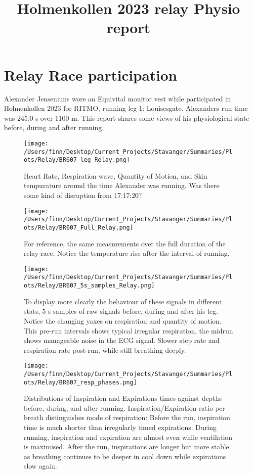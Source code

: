 \title{Holmenkollen 2023 relay Physio report}
 \maketitle
\section*{Relay Race participation}
 Alexander Jenseniuns wore an Equivital monitor vest while participated in Holmenkollen 2023 for RITMO, running leg 1: Louisesgate. 
 Alexanders run time was 245.0 s over 1100 m. This report shares some views of his physiological state before, during and after running. 
\begin{figure}[h]
\texttt{[image: /Users/finn/Desktop/Current\_Projects/Stavanger/Summaries/Plots/Relay/BR607\_leg\_Relay.png]}
\caption{Heart Rate, Respiration wave, Quantity of Motion, and Skin tempurature around the time Alexander was running. Was there some kind of disruption from 17:17:20?}
\label{leg}
\end{figure}
\begin{sidewaysfigure}[h]
\texttt{[image: /Users/finn/Desktop/Current\_Projects/Stavanger/Summaries/Plots/Relay/BR607\_Full\_Relay.png]}
\caption{For reference, the same measurements over the full duration of the relay race. Notice the temperature rise after the interval of running.}
\label{Full}
\end{sidewaysfigure}
\begin{figure}[h]
\texttt{[image: /Users/finn/Desktop/Current\_Projects/Stavanger/Summaries/Plots/Relay/BR607\_5s\_samples\_Relay.png]}
\caption{To display more clearly the behaviour of these signals in different stats, 5 s samples of raw signals before, during and after his leg. Notice the changing yaxes on respiration and quantity of motion. This pre-run intervals shows typical irregular respiration, the midrun shows manageable noise in the ECG signal. Slower step rate and respiration rate post-run, while still breathing deeply.}
\label{5s}
\end{figure}
\begin{figure}[h]
\texttt{[image: /Users/finn/Desktop/Current\_Projects/Stavanger/Summaries/Plots/Relay/BR607\_resp\_phases.png]}
\caption{Distributions of Inspiration and Expirations times against depths before, during, and after running. Inspiration/Expiration ratio per breath distinguishes mode of respiration: Before the run, inspiration time is much shorter than irregularly timed expirations. During running, inspiration and expiration are almost even while ventilation is maximised. After the run, inspirations are longer but more stable as breathing continues to be deeper in cool down while expirations slow again.}
\label{resp}
\end{figure}


